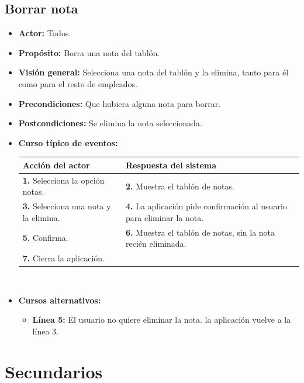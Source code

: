 \documentclass[spanish,a4paper,11pt, twoside]{report}	%
\begin{document}
		\subsection{Borrar nota}
			\begin{itemize}
			\item \textbf{Actor:} Todos.
			\item \textbf{Propósito:} Borra una nota del tablón.
			\item \textbf{Visión general:} Selecciona una nota del tablón y la elimina,
				tanto para él como para el resto de empleados.
			\item \textbf{Precondiciones:} Que hubiera alguna nota para borrar.
			\item \textbf{Postcondiciones:} Se elimina la nota seleccionada.
			\item \textbf{Curso típico de eventos:} 	\\
				\begin{tabular}{|p{6cm}||p{6cm}|}
				\hline
				\textbf{Acción del actor} & \textbf{Respuesta del sistema} \\ \hline \hline
				\textbf{1.} Selecciona la opción notas. & 
				\textbf{2.} Muestra el tablón de notas. \\ \hline
				\textbf{3.} Selecciona una nota y la elimina.	& 
				\textbf{4.} La aplicación pide confirmación al usuario para eliminar la nota. \\ \hline
				\textbf{5.} Confirma.	& 
				\textbf{6.} Muestra el tablón de notas, sin la nota recién eliminada. \\ \hline
				\textbf{7.} Cierra la aplicación. &  \\ \hline
			\end{tabular}
			\\
			\item \textbf{Cursos alternativos:} 
			\begin{itemize}
			\item  \textbf{Línea 5:} El usuario no quiere eliminar la nota. la aplicación vuelve a la línea 3.
			\end {itemize}
		\end {itemize}

\newpage

\section{Secundarios}	
\end{document}

